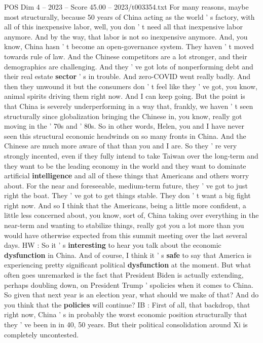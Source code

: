 \begin{textsample}{POS Dim 4 – 2023 – Score 45.00 – 2023/t003354.txt}
For many reasons, maybe most structurally, because 50 years of China acting as the world ' s factory, with all of this inexpensive labor, well, you don ' t need all that inexpensive labor anymore.
And by the way, that labor is not so inexpensive anymore.
And, you know, China hasn ' t become an open-governance system.
They haven ' t moved towards rule of law.
And the Chinese competitors are a lot stronger, and their demographics are challenging.
And they ' ve got lots of nonperforming debt and their real estate \textbf{sector} ' s in trouble.
And zero-COVID went really badly.
And then they unwound it but the consumers don ' t feel like they ' ve got, you know, animal spirits driving them right now.
And I can keep going.
But the point is that China is severely underperforming in a way that, frankly, we haven ' t seen structurally since globalization bringing the Chinese in, you know, really got moving in the ' 70s and ' 80s.
So in other words, Helen, you and I have never seen this structural economic headwinds on so many fronts in China.
And the Chinese are much more aware of that than you and I are.
So they ' re very strongly incented, even if they fully intend to take Taiwan over the long-term and they want to be the leading economy in the world and they want to dominate artificial \textbf{intelligence} and all of these things that Americans and others worry about.
For the near and foreseeable, medium-term future, they ' ve got to just right the boat.
They ' ve got to get things stable.
They don ' t want a big fight right now.
And so I think that the Americans, being a little more confident, a little less concerned about, you know, sort of, China taking over everything in the near-term and wanting to stabilize things, really got you a lot more than you would have otherwise expected from this summit meeting over the last several days.
HW : So it ' s \textbf{interesting} to hear you talk about the economic \textbf{dysfunction} in China.
And of course, I think it ' s \textbf{safe} to say that America is experiencing pretty significant political \textbf{dysfunction} at the moment.
But what often goes unremarked is the fact that President Biden is actually extending, perhaps doubling down, on President Trump ' spolicies when it comes to China.
So given that next year is an election year, what should we make of that?
And do you think that the \textbf{policies} will continue?
IB : First of all, that backdrop, that right now, China ' s in probably the worst economic position structurally that they ' ve been in in 40, 50 years.
But their political consolidation around Xi is completely uncontested.

\end{textsample}
